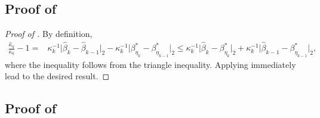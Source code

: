 \documentclass[11pt]{article}
\theoremstyle{plain}
\theoremstyle{definition}
\begin{document}
\subsection[]{Proof of }
\begin{proof}[Proof of ]
By definition,
\begin{align*}
    \frac{\widehat{\kappa}_k}{\kappa_k} - 1 =& \kappa_k^{-1} \big|\widehat{\beta}_{k} - \widehat{\beta}_{k-1}\big|_2 - \kappa_k^{-1}\big|\beta^*_{\eta_{k}} - \beta^*_{\eta_{k-1}}\big|_2 \leq \kappa_k^{-1} \big|\widehat{\beta}_{k} - \beta^*_{\eta_{k}}\big|_2 + \kappa_k^{-1}\big|\widehat{\beta}_{k-1} - \beta^*_{\eta_{k-1}}\big|_2,
\end{align*}
where the inequality follows from the triangle inequality. Applying  immediately lead to the desired result.
\end{proof}


\subsection[]{Proof of }
\end{document}
